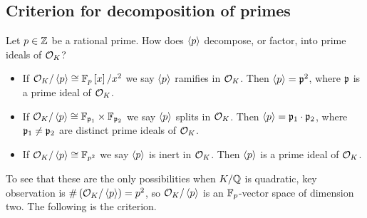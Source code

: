 \pagebreak

\subsection{Criterion for decomposition of primes}

Let $ p \in \Z $ be a rational prime. How does $ \ab{p} $ decompose, or factor, into prime ideals of $ \OO_K $?
\begin{itemize}
\item If $ \OO_K / \ab{p} \cong \F_p\sb{x} / x^2 $ we say $ \ab{p} $ ramifies in $ \OO_K $. Then $ \ab{p} = \pp^2 $, where $ \pp $ is a prime ideal of $ \OO_K $.
\item If $ \OO_K / \ab{p} \cong \F_{\pp_1} \times \F_{\pp_2} $ we say $ \ab{p} $ splits in $ \OO_K $. Then $ \ab{p} = \pp_1 \cdot \pp_2 $, where $ \pp_1 \ne \pp_2 $ are distinct prime ideals of $ \OO_K $.
\item If $ \OO_K / \ab{p} \cong \F_{p^2} $ we say $ \ab{p} $ is inert in $ \OO_K $. Then $ \ab{p} $ is a prime ideal of $ \OO_K $.
\end{itemize}
To see that these are the only possibilities when $ K / \Q $ is quadratic, key observation is $ \#\rb{\OO_K / \ab{p}} = p^2 $, so $ \OO_K / \ab{p} $ is an $ \F_p $-vector space of dimension two. The following is the criterion.


